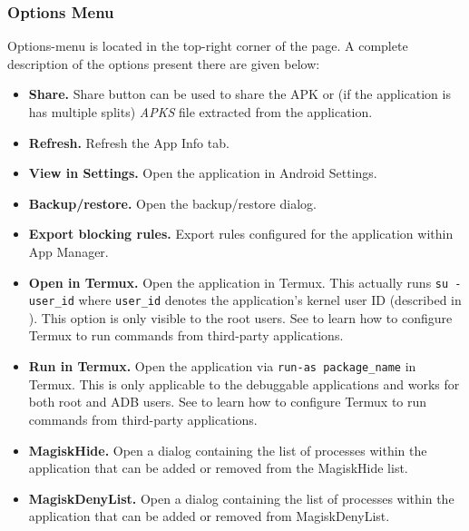 \subsubsection{Options Menu}\label{subsubsec:app-info-options-menu} %
Options-menu is located in the top-right corner of the page. A complete description of the options present there are
given below:
\begin{itemize}
    \item \textbf{Share.} Share button can be used to share the APK or (if the application is has multiple splits)
    \textit{APKS} file extracted from the application.

    \item \textbf{Refresh.} Refresh the App Info tab.

    \item \textbf{View in Settings.} Open the application in Android Settings.

    \item \textbf{Backup/restore.} Open the backup/restore dialog.

    \item \textbf{Export blocking rules.} Export rules configured for the application within App Manager.

    \item \textbf{Open in Termux.} Open the application in Termux. This actually runs \texttt{su - user\_id} where
    \texttt{user\_id} denotes the application's kernel user ID (described in ).
    This option is only visible to the root users. See  to learn how to configure Termux
    to run commands from third-party applications.

    \item \textbf{Run in Termux.} Open the application via \texttt{run-as package\_name} in Termux. This is only
    applicable to the debuggable applications and works for both root and ADB users. See 
    to learn how to configure Termux to run commands from third-party applications.

    \item \textbf{MagiskHide.} Open a dialog containing the list of processes within the application that can be added
    or removed from the MagiskHide list.

    \item \textbf{MagiskDenyList.} Open a dialog containing the list of processes within the application that can be
    added or removed from MagiskDenyList.


\end{itemize}
